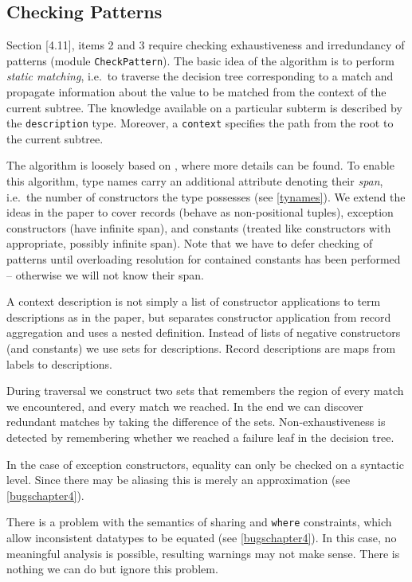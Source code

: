 \documentclass[twoside,titlepage]{article}
\begin{document}
\subsection{Checking Patterns}
\label{patterns}

Section [4.11], items 2 and 3 require checking exhaustiveness and irredundancy of patterns (module {\tt CheckPattern}). The basic idea of the algorithm is to perform {\em static matching}, i.e.\ to traverse the decision tree corresponding to a match and propagate information about the value to be matched from the context of the current subtree. The knowledge available on a particular subterm is described by the {\tt description} type. Moreover, a {\tt context} specifies the path from the root to the current subtree.

The algorithm is loosely based on \cite{patterns}, where more details can be found. To enable this algorithm, type names carry an additional attribute denoting their {\em span}, i.e.\ the number of constructors the type possesses (see \ref{tynames}). We extend the ideas in the paper to cover records (behave as non-positional tuples), exception constructors (have infinite span), and constants (treated like constructors with appropriate, possibly infinite span). Note that we have to defer checking of patterns until overloading resolution for contained constants has been performed -- otherwise we will not know their span.

A context description is not simply a list of constructor applications to term descriptions as in the paper, but separates constructor application from record aggregation and uses a nested definition. Instead of lists of negative constructors (and constants) we use sets for descriptions. Record descriptions are maps from labels to descriptions.

During traversal we construct two sets that remembers the region of every match we encountered, and every match we reached. In the end we can discover redundant matches by taking the difference of the sets. Non-exhaustiveness is detected by remembering whether we reached a failure leaf in the decision tree.

In the case of exception constructors, equality can only be checked on a syntactic level. Since there may be aliasing this is merely an approximation (see \ref{bugschapter4}).

There is a problem with the semantics of sharing and {\tt where} constraints, which allow inconsistent datatypes to be equated (see \ref{bugschapter4}). In this case, no meaningful analysis is possible, resulting warnings may not make sense. There is nothing we can do but ignore this problem.
\end{document}
